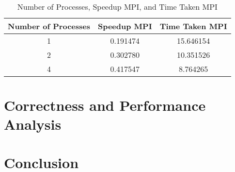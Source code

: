 \begin{table}[ht]
    \centering
    \setlength{\tabcolsep}{10pt} %
    \begin{tabular}{|c|c|c|}
        \hline
        \textbf{Number of Processes} & \textbf{Speedup MPI} & \textbf{Time
            Taken MPI}
        \\
        \hline
        1                            & 0.191474             & 15.646154
        \\
        2                            & 0.302780             & 10.351526
        \\
        4                            & 0.417547             & 8.764265
        \\
        \hline
    \end{tabular}
    \caption{Number of Processes, Speedup MPI, and Time Taken MPI}
    \label{table:2}
\end{table}
\section{Correctness and Performance Analysis}

\section{Conclusion}

